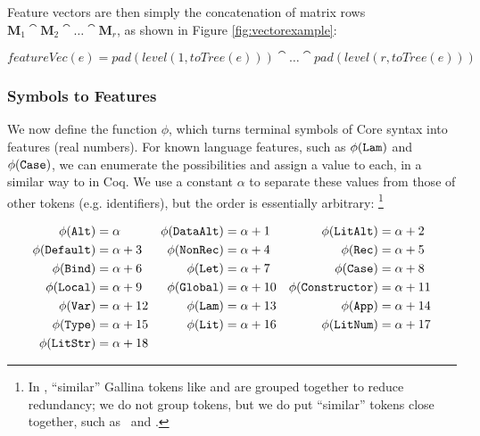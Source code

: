 \begin{sloppypar}
Feature vectors are then simply the concatenation of matrix rows $\mathbf{M}_1 \cat \mathbf{M}_2 \cat \dots \cat \mathbf{M}_r$, as shown in Figure \ref{fig:vectorexample}:
\end{sloppypar}

\begin{equation}
  featureVec(e) = pad(level(1, toTree(e))) \cat \dots \cat pad(level(r, toTree(e)))
\end{equation}

\subsubsection{Symbols to Features}
\label{sec:symbolstofeatures}

We now define the function $\phi$, which turns terminal symbols of Core syntax into features (real numbers). For known language features, such as $\phi(\texttt{Lam})$ and $\phi(\texttt{Case})$, we can enumerate the possibilities and assign a value to each, in a similar way to \citep{DBLP:journals/corr/HerasK14} in Coq. We use a constant $\alpha$ to separate these values from those of other tokens (e.g. identifiers), but the order is essentially arbitrary: \footnote{In \citep{DBLP:journals/corr/HerasK14}, ``similar'' Gallina tokens like  and  are grouped together to reduce redundancy; we do not group tokens, but we do put ``similar'' tokens close together, such as \CLocal\ and \CGlobal.}

\begin{equation} \label{eq:feature}
  \begin{aligned}
    \phi(\texttt{Alt})          &= \alpha      &
    \phi(\texttt{DataAlt})      &= \alpha + 1  &
    \phi(\texttt{LitAlt})       &= \alpha + 2  \\
    \phi(\texttt{Default})      &= \alpha + 3  &
    \phi(\texttt{NonRec})       &= \alpha + 4  &
    \phi(\texttt{Rec})          &= \alpha + 5  \\
    \phi(\texttt{Bind})         &= \alpha + 6  &
    \phi(\texttt{Let})          &= \alpha + 7  &
    \phi(\texttt{Case})         &= \alpha + 8  \\
    \phi(\texttt{Local})        &= \alpha + 9  &
    \phi(\texttt{Global})       &= \alpha + 10 &
    \phi(\texttt{Constructor})  &= \alpha + 11 \\
    \phi(\texttt{Var})          &= \alpha + 12 &
    \phi(\texttt{Lam})          &= \alpha + 13 &
    \phi(\texttt{App})          &= \alpha + 14 \\
    \phi(\texttt{Type})         &= \alpha + 15 &
    \phi(\texttt{Lit})          &= \alpha + 16 &
    \phi(\texttt{LitNum})       &= \alpha + 17 \\
    \phi(\texttt{LitStr})       &= \alpha + 18
  \end{aligned}
\end{equation}

